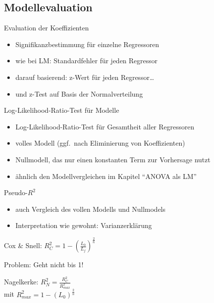 \subsection{Modellevaluation}

\begin{frame}
  {Evaluation der Koeffizienten}
  \begin{itemize}[<+->]
    \item Signifikanzbestimmung für einzelne Regressoren
    \item wie bei LM: \alert{Standardfehler} für jeden Regressor
    \item darauf basierend: \alert{z-Wert} für jeden Regressor\ldots
    \item und \alert{z-Test} auf Basis der Normalverteilung
  \end{itemize}
\end{frame}

\begin{frame}
  {Log-Likelihood-Ratio-Test für Modelle}
  \begin{itemize}[<+->]
    \item Log-Likelihood-Ratio-Test für Gesamtheit aller Regressoren
    \item volles Modell (ggf.\ nach Eliminierung von Koeffizienten)
    \item \alert{Nullmodell}, das nur einen konstanten Term zur Vorhersage nutzt
    \item ähnlich den Modellvergleichen im Kapitel "`ANOVA als LM"'
  \end{itemize}
\end{frame}

\begin{frame}
  {Pseudo-$R^2$}
  \begin{itemize}
    \item auch Vergleich des vollen Modells und Nullmodels
    \item Interpretation wie gewohnt: \alert{Varianzerklärung}
  \end{itemize}
  \pause
  \begin{center}
    Cox \& Snell: $R^2_{C}=1-(\frac{L_0}{L_f})^{\frac{2}{n}}$
  \end{center}
  \pause
  Problem: \alert{Geht nicht bis 1!}
  \pause
  \begin{center}
    \alert{Nagelkerke: $R^2_N=\frac{R^2_{C}}{R^2_{max}}$}\\[2ex]
    mit $R^2_{max}=1-(L_0)^{\frac{2}{n}}$
  \end{center}
\end{frame}

